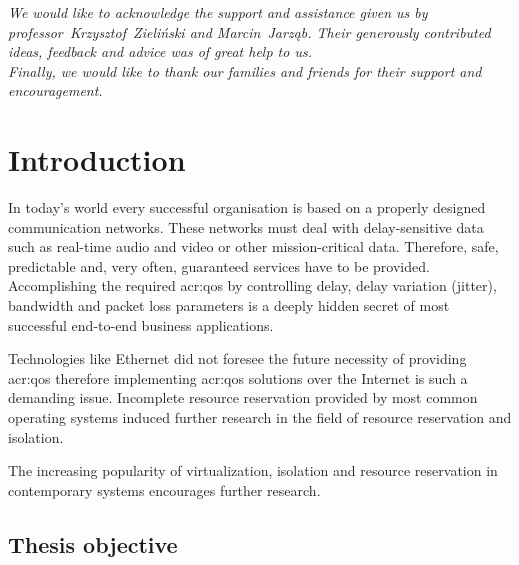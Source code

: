 \documentclass[11pt,openany]{book}
\begin{document}
	\vspace*{2in}

	\begin{center}
    \textit{We would like to acknowledge the support and assistance given us by professor~Krzysztof~Zieliński and
            Marcin~Jarząb. Their generously contributed ideas, feedback and advice was of great help to us. \\
            Finally, we would like to thank our families and friends for their support and encouragement.}
  \end{center}

  \tableofcontents

  \listoffigures

  \newpage


  \chapter{Introduction}
  \label{chap:intro}

    In today's world every successful organisation is based on a properly designed communication networks. These networks
    must deal with delay-sensitive data such as real-time audio and video or other mission-critical data. Therefore,
    safe, predictable and, very often, guaranteed services have to be provided. Accomplishing the required \gls{acr:qos}
    by controlling delay, delay variation (jitter), bandwidth and packet loss parameters is a deeply hidden secret of most
    successful end-to-end business applications.
    
    Technologies like Ethernet did not foresee  the future
    necessity of providing \gls{acr:qos} therefore implementing \gls{acr:qos} solutions over the Internet is such a
    demanding issue. Incomplete resource reservation provided by most common operating systems induced further research
    in the field of resource reservation and isolation. 


    The increasing popularity of virtualization, isolation and resource reservation in contemporary systems encourages
    further research.



    \section{Thesis objective}
\end{document}

